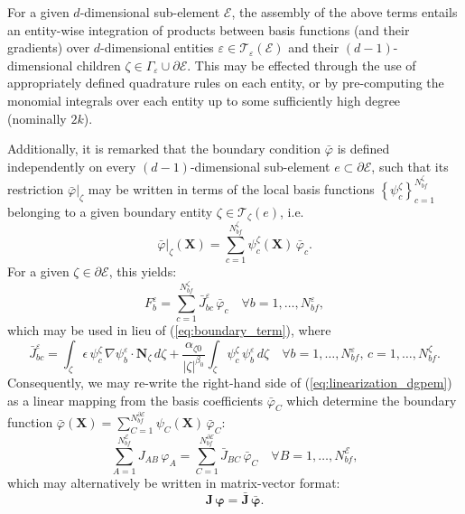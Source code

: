 	For a given $d$-dimensional sub-element $\mathcal{E}$, the assembly of the above terms entails an entity-wise integration of products between basis functions (and their gradients) over $d$-dimensional entities $\varepsilon \in \mathcal{T}_\varepsilon (\mathcal{E})$ and their $(d-1)$-dimensional children $\zeta \in \Gamma_\varepsilon \cup \partial \mathcal{E}$. This may be effected through the use of appropriately defined quadrature rules on each entity, or by pre-computing the monomial integrals over each entity up to some sufficiently high degree (nominally $2k$).
	
	Additionally, it is remarked that the boundary condition $\bar{\varphi}$ is defined independently on every $(d-1)$-dimensional sub-element $e \subset \partial \mathcal{E}$, such that its restriction $\bar{\varphi}|_\zeta$ may be written in terms of the local basis functions $\left\{ \psi^{\zeta}_c \right\}_{c=1}^{N^\zeta_{bf}}$ belonging to a given boundary entity $\zeta \in \mathcal{T}_{\zeta} (e)$, i.e.
	\begin{equation}
			\bar{\varphi}|_\zeta (\mathbf{X}) = \sum_{c=1}^{N^\zeta_{bf}} \psi^\zeta_c (\mathbf{X}) \, \bar{\varphi}_c.
	\end{equation}
	For a given $\zeta \in \partial \mathcal{E}$, this yields:
	\begin{equation}
		F^{\varepsilon}_b = \sum_{c=1}^{N^\zeta_{bf}} \bar{J}^{\varepsilon}_{bc} \, \bar{\varphi}_c \quad \forall b = 1, \ldots, N^{\varepsilon}_{bf},
	\end{equation}
	which may be used in lieu of (\ref{eq:boundary_term}), where
	\begin{equation}
		\bar{J}^{\varepsilon}_{bc} = \int_{\zeta} \epsilon \, \psi^\zeta_c \, \nabla \psi_b^{\varepsilon} \cdot \mathbf{N}_{\zeta} \, d \zeta + \frac{\alpha_{\zeta0}}{|\zeta|^{\beta_0}} \int_{\zeta} \psi^\zeta_c \, \psi_b^{\varepsilon} \, d \zeta \quad \forall b = 1, \ldots, N^{\varepsilon}_{bf}, \, c = 1, \ldots, N^\zeta_{bf}.
	\end{equation}
	Consequently, we may re-write the right-hand side of (\ref{eq:linearization_dgpem}) as a linear mapping from the basis coefficients $\bar{\varphi}_C$ which determine the boundary function $\bar{\varphi} (\mathbf{X}) = \sum_{C=1}^{N^{\partial \mathcal{E}}_{bf}} \psi_C (\mathbf{X}) \, \bar{\varphi}_C$:
	\begin{equation}
		\sum_{A=1}^{N^{\mathcal{E}}_{bf}} J_{AB} \, \varphi_A = \sum_{C=1}^{N^{\partial \mathcal{E}}_{bf}} \bar{J}_{BC} \, \bar{\varphi}_C \quad \forall B = 1, \ldots, N^{\mathcal{E}}_{bf},
	\end{equation}
	which may alternatively be written in matrix-vector format:
	\begin{equation}
		\mathbf{J} \, \boldsymbol{\varphi} = \bar{\mathbf{J}} \, \bar{\boldsymbol{\varphi}}.
		\label{eq:dgpem_linear_system}
	\end{equation}
	
